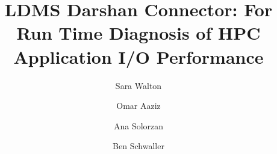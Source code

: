 \documentclass[conference]{IEEEtran}
\begin{document}
\title{LDMS Darshan Connector: For Run Time Diagnosis of HPC Application I/O Performance}

\author[1]{Sara Walton}
\author[1]{Omar Aaziz}
\author[2]{Ana Solorzan}
\author[1]{Ben Schwaller}


\begin{comment}
\and
\IEEEauthorblockN{2\textsuperscript{nd} Given Name Surname}
\IEEEauthorblockA{\textit{dept. name of organization (of Aff.)} \\
\textit{name of organization (of Aff.)}\\
City, Country \\
email address or ORCID}
\and
\IEEEauthorblockN{3\textsuperscript{rd} Given Name Surname}
\IEEEauthorblockA{\textit{dept. name of organization (of Aff.)} \\
\textit{name of organization (of Aff.)}\\
City, Country \\
email address or ORCID}
\and
\IEEEauthorblockN{4\textsuperscript{th} Given Name Surname}
\IEEEauthorblockA{\textit{dept. name of organization (of Aff.)} \\
\textit{name of organization (of Aff.)}\\
City, Country \\
email address or ORCID}
\and
\IEEEauthorblockN{5\textsuperscript{th} Given Name Surname}
\IEEEauthorblockA{\textit{dept. name of organization (of Aff.)} \\
\textit{name of organization (of Aff.)}\\
City, Country \\
email address or ORCID}
\and
\IEEEauthorblockN{6\textsuperscript{th} Given Name Surname}
\IEEEauthorblockA{\textit{dept. name of organization (of Aff.)} \\
\textit{name of organization (of Aff.)}\\
City, Country \\
email address or ORCID}
\end{comment}

\maketitle














\end{document}
